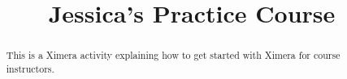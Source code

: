 \documentclass{xourse}
\title{Jessica's Practice Course}%
\begin{document}
\begin{abstract} %

This is a Ximera activity explaining how to get started with Ximera for course instructors.

\end{abstract}

\maketitle



\end{document}
